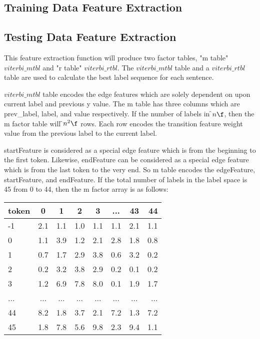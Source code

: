 \subsection{Training Data Feature Extraction}

\subsection{Testing Data Feature Extraction}
  This feature extraction function will produce two factor tables, "m table"
  $viterbi\_mtbl$ and "r table" $viterbi\_rtbl$. The $viterbi\_mtbl$
  table and a $viterbi\_rtbl$ table are used to calculate the best label
  sequence for each sentence.
 
  $viterbi\_mtbl$ table
  encodes the edge features which are solely dependent on upon current label and
  previous y value. The m table has three columns which are prev\_label, label,
  and value respectively.
  If the number of labels in \f$ n \f$, then the m factor table will \f$ n^2 \f$
  rows. Each row encodes the transition feature weight value from the previous label
  to the current label.
 
  startFeature is considered as a special edge feature which is from the
  beginning to the first token. Likewise, endFeature can be considered
  as a special edge feature which is from the last token to the very end.
  So m table encodes the edgeFeature, startFeature, and endFeature.
  If the total number of labels in the label space is 45 from 0 to 44,
  then the m factor array is as follows:
  \begin{tabular}{l*{6}{c}r}
   token             & 0   & 1   & 2   & 3   & ... & 43 &  44 \\
   \hline
  -1                 & 2.1 & 1.1 & 1.0 & 1.1 & 1.1 & 2.1 & 1.1  \\
   0                 & 1.1 & 3.9 & 1.2 & 2.1 & 2.8 & 1.8 & 0.8  \\
   1                 & 0.7 & 1.7 & 2.9 & 3.8 & 0.6 & 3.2 & 0.2  \\
   2                 & 0.2 & 3.2 & 3.8 & 2.9 & 0.2 & 0.1 & 0.2  \\
   3                 & 1.2 & 6.9 & 7.8 & 8.0 & 0.1 & 1.9 & 1.7  \\
   ...               & ... & ... & ... & ... & ... & ... & ...  \\
   44                & 8.2 & 1.8 & 3.7 & 2.1 & 7.2 & 1.3 & 7.2  \\
   45                & 1.8 & 7.8 & 5.6 & 9.8 & 2.3 & 9.4 & 1.1  \\
  \end{tabular}
 
